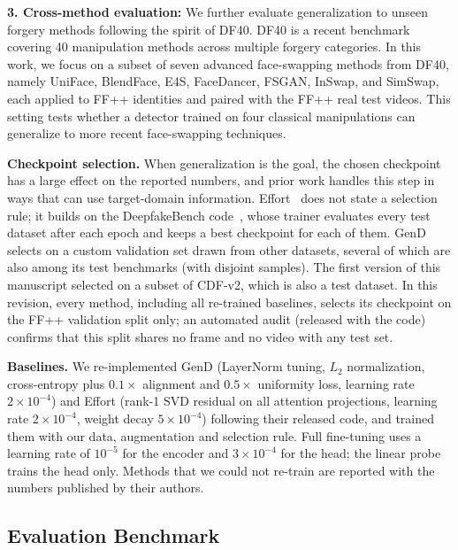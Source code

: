 \documentclass[fonts]{icst}
\newif\ifrevmark\revmarkfalse
\newcommand{\rev}[1]{\ifrevmark{\color{revblue}#1}\else#1\fi}
\newenvironment{revblock}{\ifrevmark\color{revblue}\fi}{}
\begin{document}
\textbf{3. Cross-method evaluation:}
We further evaluate generalization to unseen forgery methods following the spirit of DF40.
DF40 is a recent benchmark covering 40 manipulation methods across multiple forgery categories.
In this work, we focus on a subset of seven advanced face-swapping methods from DF40, namely UniFace, BlendFace, E4S, FaceDancer, FSGAN, InSwap, and SimSwap\rev{, each applied to FF++ identities and paired with the FF++ real test videos}.
This setting tests whether a detector trained on four classical manipulations can generalize to more recent face-swapping techniques.

\begin{revblock}
\noindent\textbf{Checkpoint selection.}\label{sec:selection}
When generalization is the goal, the chosen checkpoint has a large effect on the reported numbers, and prior work handles this step in ways that can use target-domain information. Effort~\cite{yan2025effort} does not state a selection rule; it builds on the DeepfakeBench code~\cite{yan2023deepfakebench}, whose trainer evaluates every test dataset after each epoch and keeps a best checkpoint for each of them. GenD~\cite{yermakov2025gend} selects on a custom validation set drawn from other datasets, several of which are also among its test benchmarks (with disjoint samples). The first version of this manuscript selected on a subset of CDF-v2, which is also a test dataset. In this revision, every method, including all re-trained baselines, selects its checkpoint on the FF++ validation split only; an automated audit (released with the code) confirms that this split shares no frame and no video with any test set.

\noindent\textbf{Baselines.}
We re-implemented GenD (LayerNorm tuning, $L_2$ normalization, cross-entropy plus $0.1\times$ alignment and $0.5\times$ uniformity loss, learning rate $2\times10^{-4}$) and Effort (rank-1 SVD residual on all attention projections, learning rate $2\times10^{-4}$, weight decay $5\times10^{-4}$) following their released code, and trained them with our data, augmentation and selection rule. Full fine-tuning uses a learning rate of $10^{-5}$ for the encoder and $3\times10^{-4}$ for the head; the linear probe trains the head only. Methods that we could not re-train are reported with the numbers published by their authors.
\end{revblock}

\subsection{Evaluation Benchmark}
\end{document}
